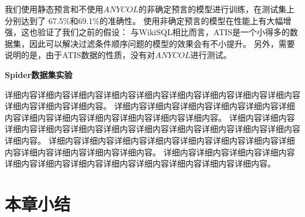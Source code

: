 我们使用静态预言和不使用$ANYCOL$的非确定预言的模型进行训练，在测试集上分别达到了 67.5\%和69.1\%的准确性。
使用非确定预言的模型在性能上有大幅增强，这也验证了我们之前的假设：
与WikiSQL相比而言，ATIS是一个小得多的数据集，因此可以解决过滤条件顺序问题的模型的效果会有不小提升。
另外，需要说明的是，由于ATIS数据的性质，没有对$ANYCOL$进行测试。

\textbf{Spider数据集实验}

详细内容详细内容详细内容详细内容详细内容详细内容详细内容详细内容详细内容详细内容详细内容详细内容。
详细内容详细内容详细内容详细内容详细内容详细内容详细内容详细内容详细内容详细内容详细内容详细内容。
详细内容详细内容详细内容详细内容详细内容详细内容详细内容详细内容详细内容详细内容详细内容详细内容。
详细内容详细内容详细内容详细内容详细内容详细内容详细内容详细内容详细内容详细内容详细内容详细内容。
详细内容详细内容详细内容详细内容详细内容详细内容详细内容详细内容详细内容详细内容详细内容详细内容。


\section{本章小结}